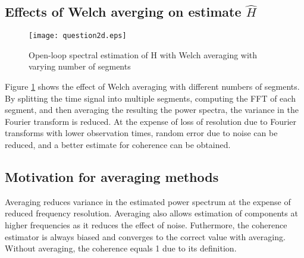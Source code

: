 \documentclass[11pt,a4paper]{article}
\begin{document}
\subsection{Effects of Welch averging on estimate $\hat{H}$}
\begin{figure}
    \begin{center}
        \texttt{[image: question2d.eps]}
    \end{center}
    \caption{Open-loop spectral estimation of H with Welch averaging with
    varying number of segments}
    \label{fig:2d}
\end{figure}
Figure \ref{fig:2d} shows the effect of Welch averaging with different numbers
of segments. By splitting the time signal into multiple segments, computing the
FFT of each segment, and then averaging the resulting the power spectra, the
variance in the Fourier transform is reduced. At the expense of loss of
resolution due to Fourier transforms with lower observation times, random error
due to noise can be reduced, and a better estimate for coherence can be
obtained.

\subsection{Motivation for averaging methods}
Averaging reduces variance in the estimated power spectrum at the expense
of reduced frequency resolution. Averaging also allows estimation of components
at higher frequencies as it reduces the effect of noise. Futhermore, the
coherence estimator is always biased and converges to the correct value with
averaging. Without averaging, the coherence equals 1 due to its definition.

\end{document}

